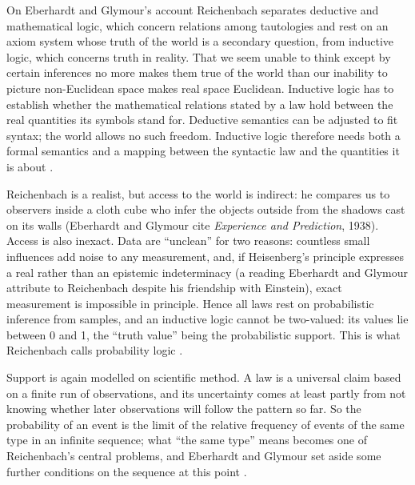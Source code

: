On Eberhardt and Glymour's account Reichenbach separates deductive and mathematical
logic, which concern relations among tautologies and rest on an axiom
system whose truth of the world is a secondary question, from inductive
logic, which concerns truth in reality. That we seem unable to think
except by certain inferences no more makes them true of the world than
our inability to picture non-Euclidean space makes real space
Euclidean. Inductive logic has to establish whether the mathematical
relations stated by a law hold between the real quantities its symbols
stand for. Deductive semantics can be adjusted to fit syntax; the world
allows no such freedom. Inductive logic therefore needs both a formal
semantics and a mapping between the syntactic law and the quantities it
is about \cite[p.~360]{EberhardtGlymour2011ReichenbachReading}.

Reichenbach is a realist, but access to the world is indirect: he
compares us to observers inside a cloth cube who infer the objects
outside from the shadows cast on its walls (Eberhardt and Glymour cite
\emph{Experience and Prediction}, 1938). Access is also inexact. Data are
``unclean'' for two reasons: countless small influences add noise to any
measurement, and, if Heisenberg's principle expresses a real rather than
an epistemic indeterminacy (a reading Eberhardt and Glymour attribute to
Reichenbach despite his friendship with Einstein), exact measurement is
impossible in principle. Hence all laws rest on probabilistic inference
from samples, and an inductive logic cannot be two-valued: its values
lie between 0 and 1, the ``truth value'' being the probabilistic
support. This is what Reichenbach calls probability logic
\cite[pp.~360--361]{EberhardtGlymour2011ReichenbachReading}.

Support is again modelled on scientific method. A law is a universal
claim based on a finite run of observations, and its uncertainty comes
at least partly from not knowing whether later observations will follow
the pattern so far. So the probability of an event is the limit of the
relative frequency of events of the same type in an infinite sequence;
what ``the same type'' means becomes one of Reichenbach's central
problems, and Eberhardt and Glymour set aside some further conditions on the
sequence at this point \cite[p.~361]{EberhardtGlymour2011ReichenbachReading}.

